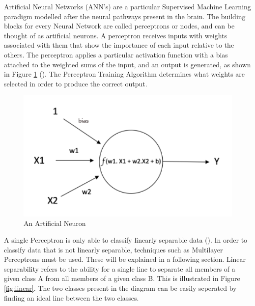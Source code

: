 \documentclass[12pt]{report}
\begin{document}
\begin{flushleft}
Artificial Neural Networks (ANN's) are a particular Supervised Machine Learning paradigm modelled after the neural pathways present in the brain. The building blocks for every Neural Network are called perceptrons or nodes, and can be thought of as artificial neurons. A perceptron receives inputs with weights associated with them that show the importance of each input relative to the others. The perceptron applies a particular activation function with a bias attached to the weighted sums of the input, and an output is generated, as shown in Figure \ref{fig:neuron} (\cite{geron2017hands}). The Perceptron Training Algorithm determines what weights are selected in order to produce the correct output.
\end{flushleft}

\vspace{0.5cm}
\begin{figure}[ht!]
	\centering
	\includegraphics[width=12cm]{neuron}
	\caption{An Artificial Neuron}
	\label{fig:neuron}
\end{figure}

\begin{flushleft}
A single Perceptron is only able to classify linearly separable data (\cite{kotsiantis2007supervised}). In order to classify data that is not linearly separable, techniques such as Multilayer Perceptrons must be used. These will be explained in a following section. Linear separability refers to the ability for a single line to separate all members of a given class A from all members of a given class B. This is illustrated in Figure \ref{fig:linear}. The two classes present in the diagram can be easily seperated by finding an ideal line between the two classes.
\end{flushleft}
\end{document}
